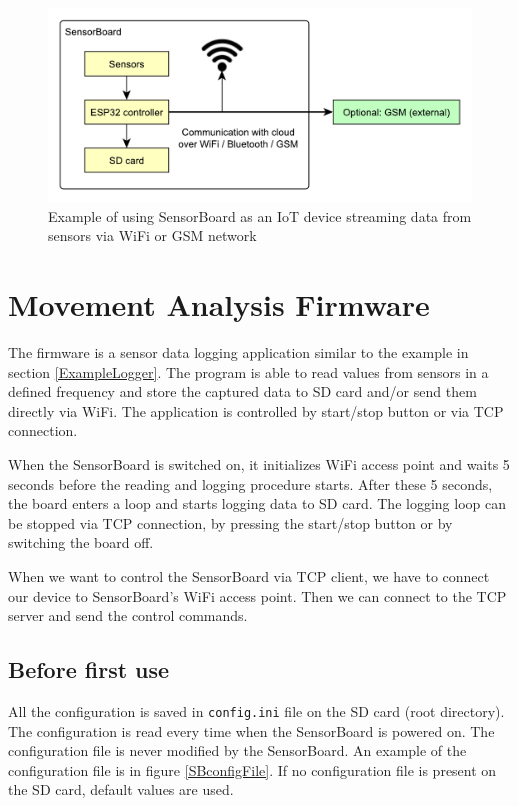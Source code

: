 \begin{figure}
	\centering
	\label{UEIoT}
	\caption{Example of using SensorBoard as an \ac{IoT} device streaming data from sensors via WiFi or GSM network}
	\includegraphics[width=\linewidth]{img/UsageExamplesIoT.pdf}
\end{figure}

\section{Movement Analysis Firmware}
\label{HorseFirmware}
The firmware is a sensor data logging application similar to the example in section \ref{ExampleLogger}. The program is able to read values from sensors in a defined frequency and store the captured data to SD card and/or send them directly via WiFi. The application is controlled by start/stop button or via \ac{TCP} connection.

When the SensorBoard is switched on, it initializes WiFi access point and waits 5 seconds before the reading and logging procedure starts. After these 5 seconds, the board enters a loop and starts logging data to SD card. The logging loop can be stopped via \ac{TCP} connection, by pressing the start/stop button or by switching the board off.

When we want to control the SensorBoard via \ac{TCP} client, we have to connect our device to SensorBoard's WiFi access point. Then we can connect to the \ac{TCP} server and send the control commands.

\subsection{Before first use}
\label{beforeFirstUse}
All the configuration is saved in \texttt{config.ini} file on the SD card (root directory). The configuration is read every time when the SensorBoard is powered on. The configuration file is never modified by the SensorBoard. An example of the configuration file is in figure \ref{SBconfigFile}. If no configuration file is present on the SD card, default values are used.

